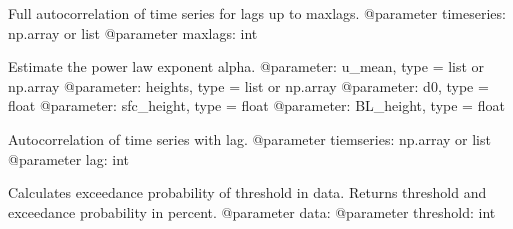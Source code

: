 \documentclass[letterpaper,10pt,english]{sphinxmanual}
\begin{document}

\begin{fulllineitems}
\label{\detokenize{index:windtunnel.calc_acorr}}
Full autocorrelation of time series for lags up to maxlags.
@parameter timeseries: np.array or list
@parameter maxlags: int

\end{fulllineitems}


\begin{fulllineitems}
\label{\detokenize{index:windtunnel.calc_alpha}}
Estimate the power law exponent alpha.
@parameter: u\_mean, type = list or np.array
@parameter: heights, type = list or np.array
@parameter: d0, type = float
@parameter: sfc\_height, type = float
@parameter: BL\_height, type = float

\end{fulllineitems}


\begin{fulllineitems}
\label{\detokenize{index:windtunnel.calc_autocorr}}
Autocorrelation of time series with lag.
@parameter tiemseries: np.array or list
@parameter lag: int

\end{fulllineitems}


\begin{fulllineitems}
\label{\detokenize{index:windtunnel.calc_exceedance_prob}}
Calculates exceedance probability of threshold in data. Returns 
threshold and exceedance probability in percent.
@parameter data: 
@parameter threshold: int

\end{fulllineitems}
\end{document}
